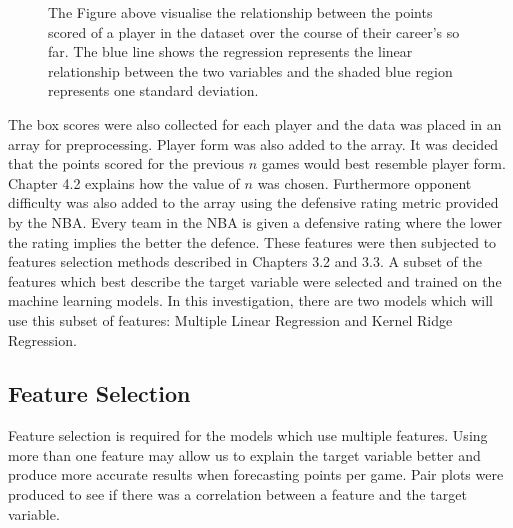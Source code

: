\documentclass[a4paper,11pt,twoside]{article}
\begin{document}
      \begin{figure}[!htb]
      \captionsetup{justification=centering}
        \caption{\label{fig:my-label} The Figure above visualise the relationship between the points scored of a player in the dataset over the course of their career's so far. The blue line shows the regression represents the linear relationship between the two variables and the shaded blue region represents one standard deviation. }
      \end{figure}

The box scores were also collected for each player and the data was placed in an array for preprocessing.  Player form was also added to the array. It was decided that the points scored for the previous $n$ games would best resemble player form. Chapter 4.2 explains how the value of $n$ was chosen. Furthermore opponent difficulty was also added to the array using the defensive rating metric provided by the NBA. Every team in the NBA is given a defensive rating where the lower the rating implies the better the defence. These features were then subjected to features selection methods described in Chapters 3.2 and 3.3. A subset of the features which best describe the target variable were selected and trained on the machine learning models. In this investigation, there are two models which will use this subset of features: Multiple Linear Regression and Kernel Ridge Regression.


\subsection{Feature Selection}

Feature selection is required for the models which use multiple features. Using more than one feature may allow us to explain the target variable better and produce more accurate results when forecasting points per game.  Pair plots were produced to see if there was a correlation between a feature and the target variable. 
\end{document}
